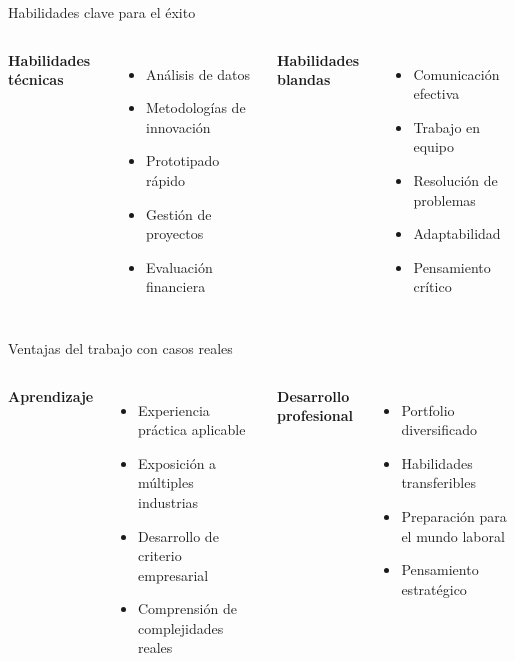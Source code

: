 \documentclass[10pt]{beamer}
\begin{document}
\begin{frame}{Habilidades clave para el éxito}
    \begin{columns}
        \textbf{Habilidades técnicas}
        \begin{itemize}
            \item Análisis de datos
            \item Metodologías de innovación
            \item Prototipado rápido
            \item Gestión de proyectos
            \item Evaluación financiera
        \end{itemize}
        
        \textbf{Habilidades blandas}
        \begin{itemize}
            \item Comunicación efectiva
            \item Trabajo en equipo
            \item Resolución de problemas
            \item Adaptabilidad
            \item Pensamiento crítico
        \end{itemize}
    \end{columns}
\end{frame}

\begin{frame}{Ventajas del trabajo con casos reales}
    \begin{columns}
        \textbf{Aprendizaje}
        \begin{itemize}
            \item Experiencia práctica aplicable
            \item Exposición a múltiples industrias
            \item Desarrollo de criterio empresarial
            \item Comprensión de complejidades reales
        \end{itemize}
        
        \textbf{Desarrollo profesional}
        \begin{itemize}
            \item Portfolio diversificado
            \item Habilidades transferibles
            \item Preparación para el mundo laboral
            \item Pensamiento estratégico
        \end{itemize}
    \end{columns}
\end{frame}
\end{document}
